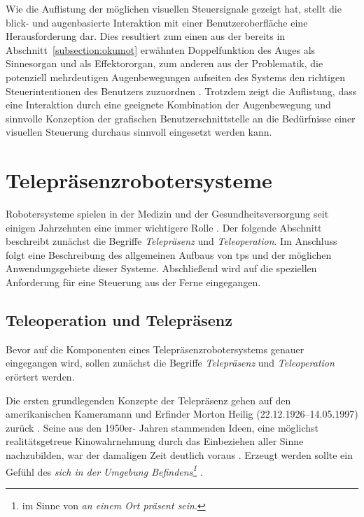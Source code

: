 Wie die Auflistung der möglichen visuellen Steuersignale gezeigt hat, stellt die blick- und augenbasierte Interaktion mit einer Benutzeroberfläche eine Herausforderung dar. Dies resultiert zum einen aus der bereits in Abschnitt~\ref{subsection:okumot} erwähnten Doppelfunktion des Auges als Sinnesorgan und als Effektororgan, zum anderen aus der Problematik, die potenziell mehrdeutigen Augenbewegungen aufseiten des Systems den richtigen Steuerintentionen des Benutzers zuzuordnen \cite{majaranta2011, Majaranta2014, Hyrskykari2006}. Trotzdem zeigt die Auflistung, dass eine Interaktion durch eine geeignete Kombination der Augenbewegung und sinnvolle Konzeption der grafischen Benutzerschnittstelle an die Bedürfnisse einer visuellen Steuerung durchaus sinnvoll eingesetzt werden kann. 


\section{Telepräsenzrobotersysteme}
\label{section:tps}
Robotersysteme spielen in der Medizin und der Gesundheitsversorgung seit einigen Jahrzehnten eine immer wichtigere Rolle \cite{tsui2011,Tsui2014,Tonin2011,Michaud2010,Labonte2010}. Der folgende Abschnitt beschreibt zunächst die Begriffe \textit{Telepräsenz} und \textit{Teleoperation}. Im Anschluss folgt eine Beschreibung des allgemeinen Aufbaus von \acs{tps} und der möglichen Anwendungsgebiete dieser Systeme. Abschließend wird auf die speziellen Anforderung für eine Steuerung aus der Ferne eingegangen. 

\subsection{Teleoperation und Telepräsenz}
\label{section:tele}
Bevor auf die Komponenten eines Telepräsenzrobotersystems genauer eingegangen wird, sollen zunächst die Begriffe \textit{Telepräsenz} und \textit{Teleoperation} erörtert werden. 

Die ersten grundlegenden Konzepte der Telepräsenz gehen auf den amerikanischen Kameramann und Erfinder Morton Heilig (22.12.1926–14.05.1997) zurück \cite{Peters2013}. Seine aus den 1950er- Jahren stammenden Ideen, eine möglichst realitätsgetreue Kinowahrnehmung durch das Einbeziehen aller Sinne nachzubilden, war der damaligen Zeit deutlich voraus \cite{packer2002,Peters2013}. Erzeugt werden sollte ein Gefühl des \textit{sich in der Umgebung Befindens\footnote{im Sinne von \textit{an einem Ort präsent sein}.}} \cite{Peters2013}. 

